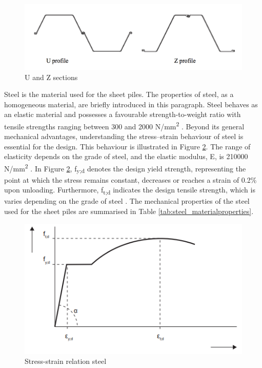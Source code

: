 \begin{figure}[H]
    \centering
    \includegraphics[width=0.60\linewidth]{figures/ch8/u_profile_z_profile.png}
    \caption{U and Z sections \autocite{sheetpilinggroupSheetPiles2018}}
    \label{fig:sections_sheetpiles}
\end{figure}

Steel is the material used for the sheet piles. The properties of steel, as a homogeneous material, are briefly introduced in this paragraph. Steel behaves as an elastic material and possesses a favourable strength-to-weight ratio with tensile strengths ranging between 300 and 2000 N/mm\textsuperscript{2} \autocite{grabeSheetPilingHandbook2008}. Beyond its general mechanical advantages, understanding the stress–strain behaviour of steel is essential for the design. This behaviour is illustrated in Figure \ref{fig:stress_strain_steel}. The range of elasticity depends on the grade of steel, and the elastic modulus, E, is  210000 N/mm\textsuperscript{2} \autocite{schipper81MaterialCharacteristics2024}. In Figure \ref{fig:stress_strain_steel}, f\textsubscript{y;d} denotes the design yield strength, representing the point at which the stress remains constant, decreases or reaches a strain of 0.2\% upon unloading. Furthermore, f\textsubscript{t;d} indicates the design tensile strength, which is varies depending on the grade of steel \autocite{grabeSheetPilingHandbook2008}. The mechanical properties of the steel used for the sheet piles are summarised in Table \ref{tab:steel_materialproperties}.

\begin{figure}[H]
    \centering
    \includegraphics[width=0.70\linewidth]{figures/ch8/stress_strain_steel.png}
    \caption{Stress-strain relation steel \autocite{schipper81MaterialCharacteristics2024}}
    \label{fig:stress_strain_steel}
\end{figure}

